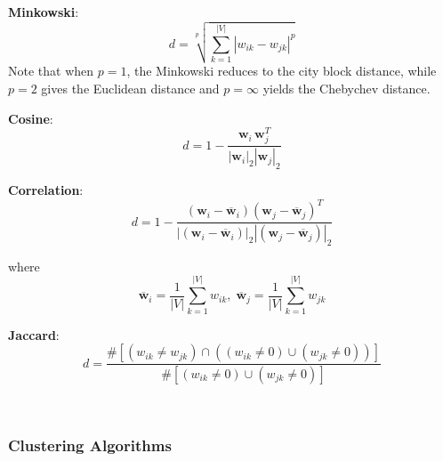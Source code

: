 \documentclass[conference]{IEEEtran}
\begin{document}
\textbf{Minkowski}: 
\begin{equation*}
	d = \sqrt[p]{\sum_{k=1}^{|V|}|w_{ik} - w_{jk}|^p}
\end{equation*}
 Note that when $p=1$, the Minkowski reduces to the city block distance, while $p=2$ gives the Euclidean distance and $p=\infty$ yields the Chebychev distance.

\textbf{Cosine}: 
\begin{equation*}
d = 1 - \frac{\mathbf{w}_i\,\mathbf{w}_j^T}{|\mathbf{w}_i|_2|\mathbf{w}_j|_2}
\end{equation*}

\textbf{Correlation}: 
\begin{equation*}
d = 1 - \frac{(\mathbf{w}_i - \overline{\mathbf{w}}_i)(\mathbf{w}_j - \overline{\mathbf{w}}_j)^T}{|(\mathbf{w}_i - \overline{\mathbf{w}}_i)|_2|(\mathbf{w}_j - \overline{\mathbf{w}}_j)|_2}
\end{equation*}

where 
\begin{equation*}
	\overline{\mathbf{w}}_i = \frac{1}{|V|}\sum_{k=1}^{|V|}w_{ik},\;
	\overline{\mathbf{w}}_j = \frac{1}{|V|}\sum_{k=1}^{|V|}w_{jk}
\end{equation*}

\textbf{Jaccard}: 
\begin{equation*}
	d = \frac{\# \left[(w_{ik} \neq w_{jk})\cap((w_{ik} \neq 0)\cup(w_{jk} \neq 0))\right]}{\#\left[(w_{ik} \neq 0)\cup(w_{jk} \neq 0)\right]}
\end{equation*}

\-\\

\subsubsection{Clustering Algorithms}
\end{document}
